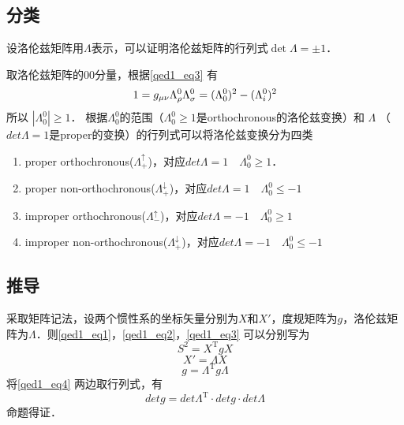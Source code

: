\subsection{分类}
设洛伦兹矩阵用$\Lambda$表示，可以证明洛伦兹矩阵的行列式$\det \Lambda=\pm1$．

取洛伦兹矩阵的00分量，根据\autoref{qed1_eq3} 有
\begin{equation}
1=g_{\mu \nu} \Lambda_{\rho}^{0} \Lambda_{\sigma}^{0}= (\Lambda_{0}^{0})^2- (\Lambda_{i}^{0})^2\\
\end{equation}
所以 $\left|\Lambda_{0}^{0} \right|\geqslant1$． 根据$\Lambda_{0}^{0}$的范围（$\Lambda_{0}^{0}\geqslant1$是orthochronous的洛伦兹变换）和 $\Lambda$ （$det\Lambda=1$是proper的变换）的行列式可以将洛伦兹变换分为四类
\begin{enumerate}
\item proper orthochronous($\Lambda_{+}^{\uparrow}$)，对应$det\Lambda=1\quad \Lambda_{0}^{0}\geqslant1$．
\item proper non-orthochronous($\Lambda_{+}^{\downarrow}$)，对应$det\Lambda=1\quad \Lambda_{0}^{0}\leqslant-1$
\item improper orthochronous($\Lambda_{-}^{\uparrow}$)，对应$det\Lambda=-1 \quad\Lambda_{0}^{0}\geqslant1$
\item improper non-orthochronous($\Lambda_{+}^{\downarrow}$)，对应$det\Lambda=-1 \quad\Lambda_{0}^{0}\leqslant-1$
\end{enumerate}
\subsection{推导}
采取矩阵记法，设两个惯性系的坐标矢量分别为$X$和$X'$，度规矩阵为$g$，洛伦兹矩阵为$\Lambda$．则\autoref{qed1_eq1}，\autoref{qed1_eq2}，\autoref{qed1_eq3} 可以分别写为
\begin{equation}
S^{2}=X^{\mathrm{T}} g X
\end{equation}
\begin{equation}
X'=\Lambda X
\end{equation}
\begin{equation}\label{qed1_eq4}
g=\Lambda^{\mathrm{T}} g \Lambda
\end{equation}
将\autoref{qed1_eq4} 两边取行列式，有
\begin{equation}
detg=det\Lambda^{\mathrm{T}}\cdot detg\cdot det\Lambda
\end{equation}
命题得证．
